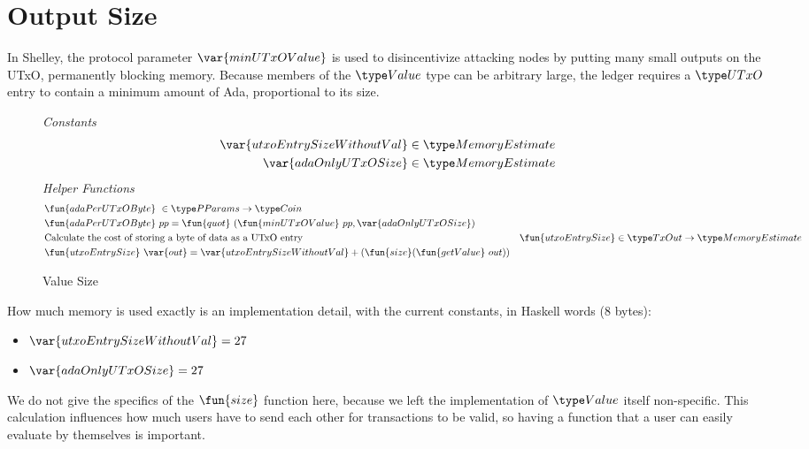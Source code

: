 \section{Output Size}
\label{sec:value-size}

In Shelley, the protocol parameter $\var{minUTxOValue}$ is used to
disincentivize attacking nodes by putting many small outputs on the
UTxO, permanently blocking memory. Because members of the $\Value$
type can be arbitrary large, the ledger requires a $\UTxO$ entry to
contain a minimum amount of Ada, proportional to its size.

\begin{figure*}[h]
  \emph{Constants}
  \begin{align*}
  \var{utxoEntrySizeWithoutVal} \in \MemoryEstimate \\
  \var{adaOnlyUTxOSize} \in \MemoryEstimate
  \end{align*}
  \emph{Helper Functions}
  \begin{align*}
    & \fun{adaPerUTxOByte}~\in \PParams \to \Coin \\
    & \fun{adaPerUTxOByte}~pp = \fun{quot}~ (\fun{minUTxOValue}~pp, \var{adaOnlyUTxOSize}) \\
    & \text{Calculate the cost of storing a byte of data as a UTxO entry}
    & \fun{utxoEntrySize} \in \TxOut \to \MemoryEstimate \\
    & \fun{utxoEntrySize}~\var{out} = \var{utxoEntrySizeWithoutVal} + (\fun{size} (\fun{getValue}~out))
  \end{align*}
  \caption{Value Size}
  \label{fig:test}
\end{figure*}

How much memory is used exactly is an implementation detail, with the current constants, in Haskell words (8 bytes):
\begin{itemize}
  \item $\var{utxoEntrySizeWithoutVal} = 27$
  \item $\var{adaOnlyUTxOSize} = 27$
\end{itemize}

We do not give the specifics of the $\fun{size}$ function here, because
we left the implementation of $\Value$ itself non-specific. This calculation
influences how much users have to send each
other for transactions to be valid, so having a function that a user
can easily evaluate by themselves is important.
